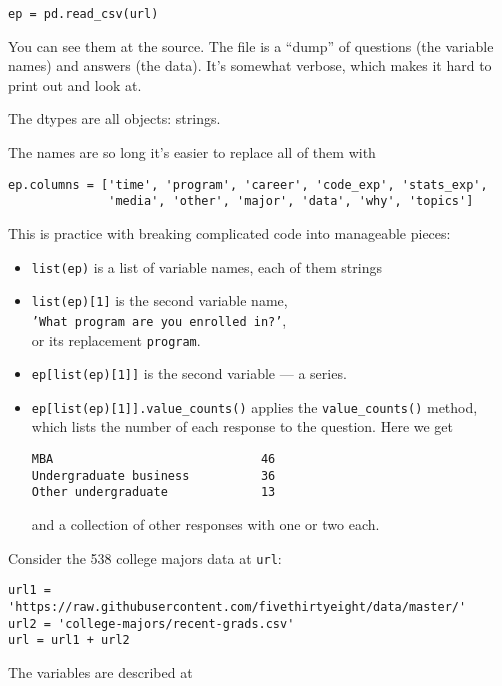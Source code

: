 \documentclass[11pt]{exam}
\begin{document}
\begin{questions}
\begin{solution}
\begin{parts}
\item \verb|ep = pd.read_csv(url)|
\item You can see them at the source.  The file is a ``dump''
of questions (the variable names) and answers (the data).
It's somewhat verbose, which makes it hard to print out and look at.

\item The dtypes are all objects:  strings.

\item The names are so long it's easier to replace all of them with
\begin{verbatim}
ep.columns = ['time', 'program', 'career', 'code_exp', 'stats_exp',
              'media', 'other', 'major', 'data', 'why', 'topics']
\end{verbatim}

\item This is practice with breaking complicated code into manageable pieces:
\begin{itemize}
\item {\tt list(ep)} is a list of variable names, each of them strings
\item {\tt list(ep)[1]} is the second variable name, \\
{\tt 'What program are you enrolled in?'},\\
or its replacement {\tt program}.
\item {\tt ep[list(ep)[1]]} is the second variable --- a series.
\item \verb|ep[list(ep)[1]].value_counts()|  applies the
\verb|value_counts()| method, which lists the number of each response to the question.  Here we get
\begin{verbatim}
MBA                             46
Undergraduate business          36
Other undergraduate             13
\end{verbatim}
and a collection of other responses with one or two each.

\end{itemize}


\end{parts}
\end{solution}


\item  Consider the 538 college majors data at {\tt url}:
\begin{verbatim}
url1 = 'https://raw.githubusercontent.com/fivethirtyeight/data/master/'
url2 = 'college-majors/recent-grads.csv'
url = url1 + url2
\end{verbatim}
The variables are described at


\end{questions}
\end{document}
